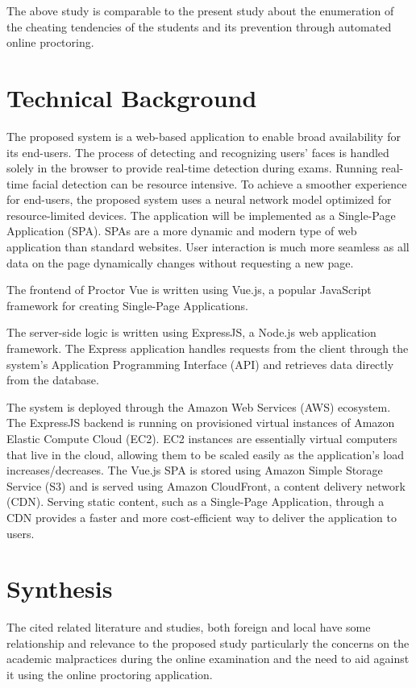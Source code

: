 The above study is comparable to the present study about the enumeration of the cheating tendencies of the students and its prevention through automated online proctoring.

\section{Technical Background}

The proposed system is a web-based application to enable broad availability for its end-users.
The process of detecting and recognizing users' faces is handled solely in the browser to provide real-time detection during exams.
Running real-time facial detection can be resource intensive.
To achieve a smoother experience for end-users, the proposed system uses a neural network model optimized for resource-limited devices.
The application will be implemented as a Single-Page Application (SPA).
SPAs are a more dynamic and modern type of web application than standard websites.
User interaction is much more seamless as all data on the page dynamically changes without requesting a new page.

The frontend of Proctor Vue is written using Vue.js, a popular JavaScript framework for creating Single-Page Applications.

The server-side logic is written using ExpressJS, a Node.js web application framework.
The Express application handles requests from the client through the system's Application Programming Interface (API) and retrieves data directly from the database.

The system is deployed through the Amazon Web Services (AWS) ecosystem.
The ExpressJS backend is running on provisioned virtual instances of Amazon Elastic Compute Cloud (EC2).
EC2 instances are essentially virtual computers that live in the cloud, allowing them to be scaled easily as the application's load increases/decreases.
The Vue.js SPA is stored using Amazon Simple Storage Service (S3) and is served using Amazon CloudFront, a content delivery network (CDN).
Serving static content, such as a Single-Page Application, through a CDN provides a faster and more cost-efficient way to deliver the application to users.

\section{Synthesis}

The cited related literature and studies, both foreign and local have some relationship and relevance to the proposed study particularly the concerns on the academic malpractices during the online examination and the need to aid against it using the online proctoring application.

